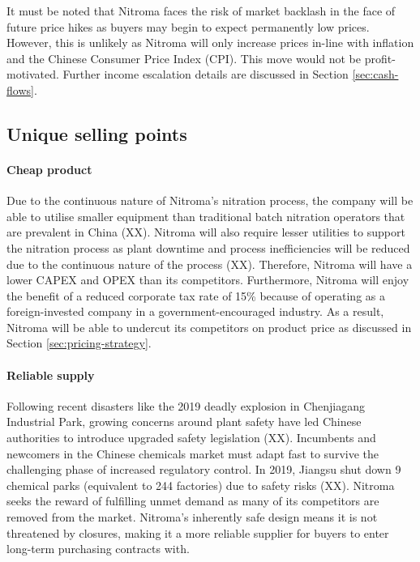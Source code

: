 It must be noted that Nitroma faces the risk of market backlash in the face of future price hikes as buyers may begin to expect permanently low prices. However, this is unlikely as Nitroma will only increase prices in-line with inflation and the Chinese Consumer Price Index (CPI). This move would not be profit-motivated. Further income escalation details are discussed in Section \ref{sec:cash-flows}.

\subsection{Unique selling points}
\label{sec:USP}
\paragraph{Cheap product}
Due to the continuous nature of Nitroma’s nitration process, the company will be able to utilise smaller equipment than traditional batch nitration operators that are prevalent in China (XX). Nitroma will also require lesser utilities to support the nitration process as plant downtime and process inefficiencies will be reduced due to the continuous nature of the process (XX). Therefore, Nitroma will have a lower CAPEX and OPEX than its competitors. Furthermore, Nitroma will enjoy the benefit of a reduced corporate tax rate of 15\% because of operating as a foreign-invested company in a government-encouraged industry. As a result, Nitroma will be able to undercut its competitors on product price as discussed in Section \ref{sec:pricing-strategy}.

\paragraph{Reliable supply}
Following recent disasters like the 2019 deadly explosion in Chenjiagang Industrial Park, growing concerns around plant safety have led Chinese authorities to introduce upgraded safety legislation (XX). Incumbents and newcomers in the Chinese chemicals market must adapt fast to survive the challenging phase of increased regulatory control. In 2019, Jiangsu shut down 9 chemical parks (equivalent to 244 factories) due to safety risks (XX). Nitroma seeks the reward of fulfilling unmet demand as many of its competitors are removed from the market. Nitroma’s inherently safe design means it is not threatened by closures, making it a more reliable supplier for buyers to enter long-term purchasing contracts with.

